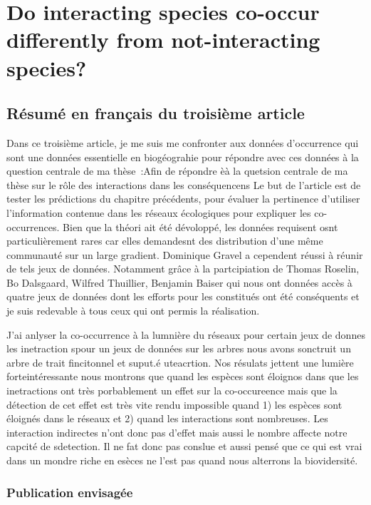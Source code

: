 \chapter{Do interacting species co-occur differently from not-interacting species?}
\label{chap3}

\section{Résumé en français du troisième article}

Dans ce troisième article, je me suis me confronter aux données d'occurrence qui sont une données essentielle en biogéograhie pour répondre avec ces données à la question centrale de ma thèse~:Afin de répondre èà la quetsion centrale de ma thèse sur le rôle des interactions dans les conséquencens
Le but de l'article est de tester les prédictions du chapitre précédents, pour évaluer la pertinence d'utiliser l'information
contenue dans les réseaux écologiques pour expliquer les co-occurrences.
Bien que la théori ait été dévoloppé, les données requisent osnt particulièrement rares car elles demandesnt des distribution d'une même communauté sur un large gradient. Dominique Gravel a cependent réussi à réunir de tels jeux de données. Notamment grâce à la partcipiation de Thomas Roselin, Bo Dalsgaard, Wilfred Thuillier, Benjamin Baiser qui nous ont données accès à quatre jeux de données dont les efforts pour les constitués ont été conséquents et je suis redevable à tous ceux qui ont permis la réalisation.

J'ai anlyser la co-occurrence à la lumnière du réseaux pour certain jeux de donnes les inetraction spour un jeux de données sur les arbres nous avons sonctruit un arbre de trait fincitonnel et suput.é uteacrtion. Nos résulats jettent une lumière forteintéressante nous montrons que quand les espèces sont éloignos dans  que les inetractions ont très porbablement un effet sur la co-occureence mais que la détection de cet effet est très vite rendu impossible quand 1) les espèces sont éloignés dans le réseaux et 2) quand les interactions sont nombreuses. Les interaction indirectes n'ont donc pas d'effet mais aussi le nombre affecte notre capcité de sdetection. Il ne fat donc pas conslue et aussi pensé que ce qui est vrai dans un mondre riche en esèces ne l'est pas quand nous alterrons la biovidersité.



\subsection{Publication envisagée}

